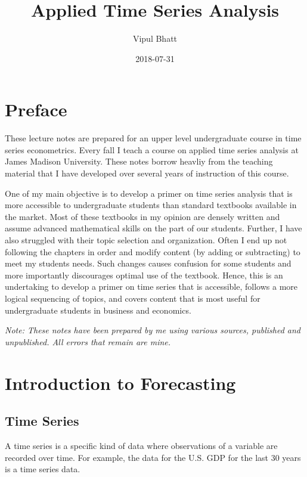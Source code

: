 \documentclass[]{book}
\title{Applied Time Series Analysis}
\author{Vipul Bhatt}
\date{2018-07-31}
\theoremstyle{definition}
\theoremstyle{definition}
\theoremstyle{definition}
\theoremstyle{remark}
\begin{document}
\maketitle

{
\setcounter{tocdepth}{1}
\tableofcontents
}
\chapter*{Preface}\label{preface}

These lecture notes are prepared for an upper level undergraduate course
in time series econometrics. Every fall I teach a course on applied time
series analysis at James Madison University. These notes borrow heavliy
from the teaching material that I have developed over several years of
instruction of this course.

One of my main objective is to develop a primer on time series analysis
that is more accessible to undergraduate students than standard
textbooks available in the market. Most of these textbooks in my opinion
are densely written and assume advanced mathematical skills on the part
of our students. Further, I have also struggled with their topic
selection and organization. Often I end up not following the chapters in
order and modify content (by adding or subtracting) to meet my students
needs. Such changes causes confusion for some students and more
importantly discourages optimal use of the textbook. Hence, this is an
undertaking to develop a primer on time series that is accessible,
follows a more logical sequencing of topics, and covers content that is
most useful for undergraduate students in business and economics.

\emph{Note: These notes have been prepared by me using various sources,
published and unpublished. All errors that remain are mine.}

\chapter{Introduction to Forecasting}\label{intro}

\section{Time Series}\label{time-series}

A time series is a specific kind of data where observations of a
variable are recorded over time. For example, the data for the U.S. GDP
for the last 30 years is a time series data.
\end{document}

